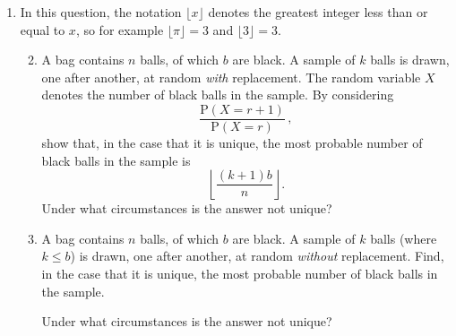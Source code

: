 \documentclass[a4, 11pt]{report}
\newlength{\qspace}
\newcounter{qnumber}
\newenvironment{question}%
 {\vspace{\qspace}
  \begin{enumerate}[\bfseries 1\quad][10]%
    \setcounter{enumi}{\value{qnumber}}%
    \item%
 }
{
  \end{enumerate}
  \filbreak
  \stepcounter{qnumber}
 }
\newenvironment{questionparts}[1][1]%
 {
  \begin{enumerate}[\bfseries (i)]%
    \setcounter{enumii}{#1}
    \addtocounter{enumii}{-1}
    \setlength{\itemsep}{5mm}
    \setlength{\parskip}{8pt}
 }
 {
  \end{enumerate}
 }
\def\P{{\mathrm P}}
\def\le{\leqslant}
\begin{document}
\begin{question}
In this question, the notation $\lfloor x \rfloor$
denotes the greatest integer less than or equal to $x$,
so for example $\lfloor \pi\rfloor = 3$ and $\lfloor 3 \rfloor =3$.
\begin{questionparts}
\item
A bag contains $n$ balls, of which $b$ are black. A sample of $k$ balls
is drawn, one after another, at random {\sl with} replacement. The random 
variable $X$ denotes the number of black balls in the sample.
By considering 
\[
\frac{\P(X=r+1)}{\P(X=r)}\,,
\]
show that, in the case that it is unique,   
the most probable number of black balls
in the sample is 
\[
\left\lfloor \frac{(k+1)b}{n}\right\rfloor.
\]
Under what circumstances is the answer not unique?

\item A bag contains 
$n$ balls, of which $b$ are black. A sample of $k$ balls
(where $k\le b$)
is drawn, one after another, at random {\sl without} replacement. 
Find, in the case that it is unique, the most probable number of black
balls in the sample.

Under what circumstances is the answer not unique?

\end{questionparts} 
\end{question}
\end{document}
